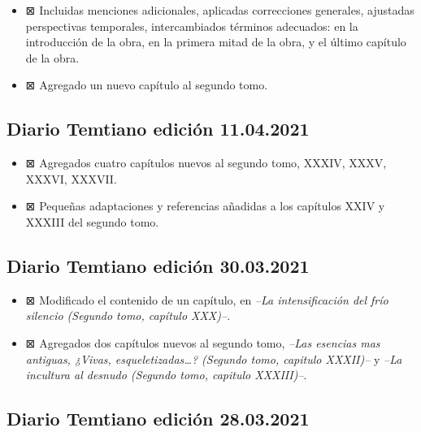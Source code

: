 \documentclass[
]{book}
\begin{document}
\begin{itemize}
\item
  ⊠ Incluidas menciones adicionales, aplicadas correcciones generales, ajustadas perspectivas temporales, intercambiados términos adecuados: en la introducción de la obra, en la primera mitad de la obra, y el último capítulo de la obra.
\item
  ⊠ Agregado un nuevo capítulo al segundo tomo.
\end{itemize}

\hypertarget{diario-temtiano-ediciuxf3n-11.04.2021}{%
\subsection*{Diario Temtiano edición 11.04.2021}\label{diario-temtiano-ediciuxf3n-11.04.2021}}

\begin{itemize}
\item
  ⊠ Agregados cuatro capítulos nuevos al segundo tomo, XXXIV, XXXV, XXXVI, XXXVII.
\item
  ⊠ Pequeñas adaptaciones y referencias añadidas a los capítulos XXIV y XXXIII del segundo tomo.
\end{itemize}

\hypertarget{diario-temtiano-ediciuxf3n-30.03.2021}{%
\subsection*{Diario Temtiano edición 30.03.2021}\label{diario-temtiano-ediciuxf3n-30.03.2021}}

\begin{itemize}
\item
  ⊠ Modificado el contenido de un capítulo, en \emph{--La intensificación del frío silencio (Segundo tomo, capítulo XXX)--}.
\item
  ⊠ Agregados dos capítulos nuevos al segundo tomo, \emph{--Las esencias mas antiguas, ¿Vivas, esqueletizadas\ldots? (Segundo tomo, capitulo XXXII)--} y \emph{--La incultura al desnudo (Segundo tomo, capitulo XXXIII)--}.
\end{itemize}

\hypertarget{diario-temtiano-ediciuxf3n-28.03.2021}{%
\subsection*{Diario Temtiano edición 28.03.2021}\label{diario-temtiano-ediciuxf3n-28.03.2021}}
\end{document}

